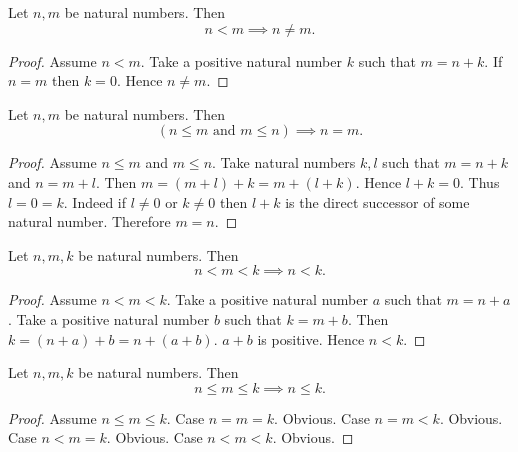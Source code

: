 \documentclass[../arithmetic.tex]{subfiles}
\begin{document}
  \begin{forthel}
    \begin{proposition}
      Let $n, m$ be natural numbers.
      Then \[ n < m \implies n \neq m. \]
    \end{proposition}
    \begin{proof}
      Assume $n < m$.
      Take a positive natural number $k$ such that $m = n + k$.
      If $n = m$ then $k = 0$.
      Hence $n \neq m$.
    \end{proof}
  \end{forthel}

  \begin{forthel}
    \begin{proposition}
      Let $n, m$ be natural numbers.
      Then \[ (\text{$n \leq m$ and $m \leq n$}) \implies n = m. \]
    \end{proposition}
    \begin{proof}
      Assume $n \leq m$ and $m \leq n$.
      Take natural numbers $k, l$ such that $m = n + k$ and $n = m + l$.
      Then $m
        = (m + l) + k
        = m + (l + k)$.
      Hence $l + k = 0$.
      Thus $l = 0 = k$.
      Indeed if $l \neq 0$ or $k \neq 0$ then $l + k$ is the direct successor of
      some natural number.
      Therefore $m = n$.
    \end{proof}
  \end{forthel}

  \begin{forthel}
    \begin{proposition}
      Let $n, m, k$ be natural numbers.
      Then \[ n < m < k \implies n < k. \]
    \end{proposition}
    \begin{proof}
      Assume $n < m < k$.
      Take a positive natural number $a$ such that $m = n + a$.
      Take a positive natural number $b$ such that $k = m + b$.
      Then $k
        = (n + a) + b
        = n + (a + b)$.
      $a + b$ is positive.
      Hence $n < k$.
    \end{proof}
  \end{forthel}

  \begin{forthel}
    \begin{proposition}
      Let $n, m, k$ be natural numbers.
      Then \[ n \leq m \leq k \implies n \leq k. \]
    \end{proposition}
    \begin{proof}
      Assume $n \leq m \leq k$.
      Case $n = m = k$. Obvious.
      Case $n = m < k$. Obvious.
      Case $n < m = k$. Obvious.
      Case $n < m < k$. Obvious.
    \end{proof}
  \end{forthel}
\end{document}
